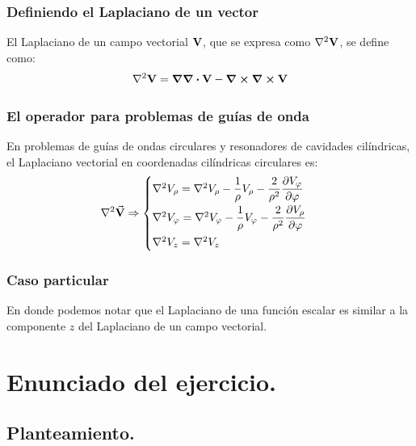 \documentclass[12pt]{beamer}
\begin{document}
\begin{frame}
\frametitle{Definiendo el Laplaciano de un vector}
El Laplaciano de un campo vectorial $\vb{V}$, que se expresa como $\laplacian{\vb{V}}$, se define como:
\pause
\begin{align*}
\laplacian{\vb{V}} = \grad{\div{\vb{V}}} - \curl{\curl{\vb{V}}}
\end{align*}
\end{frame}
\begin{frame}
\frametitle{El operador para problemas de guías de onda}
En problemas de guías de ondas circulares y resonadores de cavidades cilíndricas, el Laplaciano vectorial en coordenadas cilíndricas circulares es:
\pause
\begin{align*}
\laplacian{\va{V}} \Rightarrow \begin{cases}
\laplacian{V_{\rho}} = \laplacian{V_{\rho}} - \dfrac{1}{\rho} V_{\rho} - \dfrac{2}{\rho^{2}} \displaystyle \pdv{V_{\varphi}}{\varphi} \\[0.75em]
\laplacian{V_{\varphi}} = \laplacian{V_{\varphi}} - \dfrac{1}{\rho} V_{\varphi} - \dfrac{2}{\rho^{2}} \displaystyle \pdv{V_{\rho}}{\varphi} \\[0.75em]
\laplacian{V_{z}} = \laplacian{V_{z}}
\end{cases}
\end{align*}
\end{frame}
\begin{frame}
\frametitle{Caso particular}
En donde podemos notar que el Laplaciano de una función escalar es similar a la componente $z$ del Laplaciano de un campo vectorial.
\end{frame}

\section{Enunciado del ejercicio.}
\subsection{Planteamiento.}
\end{document}
